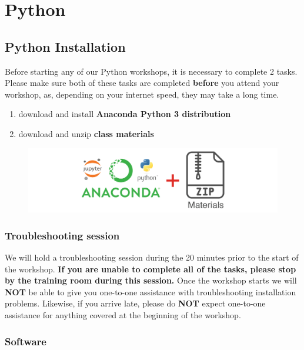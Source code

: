 \documentclass[]{book}
\providecommand{\tightlist}{%
  \setlength{\itemsep}{0pt}\setlength{\parskip}{0pt}}
\begin{document}
\part{Python}\label{part-python}

\chapter{Python Installation}\label{python-installation}

Before starting any of our Python workshops, it is necessary to complete
2 tasks. Please make sure both of these tasks are completed
\textbf{before} you attend your workshop, as, depending on your internet
speed, they may take a long time.

\begin{enumerate}
\def\labelenumi{\arabic{enumi}.}
\tightlist
\item
  download and install \textbf{Anaconda Python 3 distribution}
\item
  download and unzip \textbf{class materials}
\end{enumerate}

\begin{figure}
\centering
\includegraphics{Python/PythonInstall/images/install_software_Python.png}
\caption{}
\end{figure}

\section{Troubleshooting session}\label{troubleshooting-session-1}

We will hold a troubleshooting session during the 20 minutes prior to
the start of the workshop. \textbf{If you are unable to complete all of
the tasks, please stop by the training room during this session.} Once
the workshop starts we will \textbf{NOT} be able to give you one-to-one
assistance with troubleshooting installation problems. Likewise, if you
arrive late, please do \textbf{NOT} expect one-to-one assistance for
anything covered at the beginning of the workshop.

\section{Software}\label{software-1}
\end{document}
